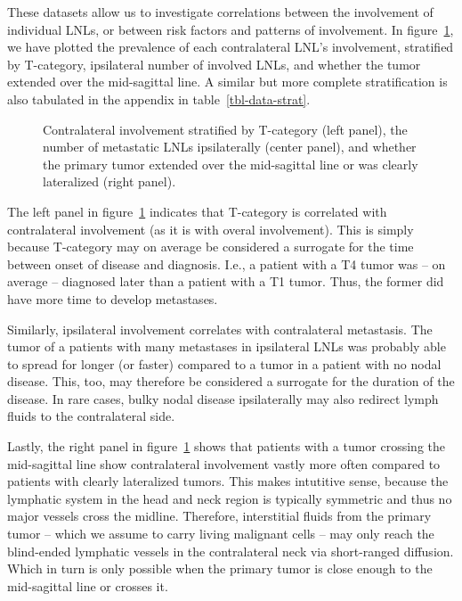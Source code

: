\documentclass[
  sn-mathphys-num,
]{sn-jnl}
\begin{document}
These datasets allow us to investigate correlations between the
involvement of individual LNLs, or between risk factors and patterns of
involvement. In figure~\ref{fig-data-strat}, we have plotted the
prevalence of each contralateral LNL's involvement, stratified by
T-category, ipsilateral number of involved LNLs, and whether the tumor
extended over the mid-sagittal line. A similar but more complete
stratification is also tabulated in the appendix in
table~\ref{tbl-data-strat}.

\begin{figure}


\caption{\label{fig-data-strat}Contralateral involvement stratified by
T-category (left panel), the number of metastatic LNLs ipsilaterally
(center panel), and whether the primary tumor extended over the
mid-sagittal line or was clearly lateralized (right panel).}

\end{figure}%

The left panel in figure~\ref{fig-data-strat} indicates that T-category
is correlated with contralateral involvement (as it is with overal
involvement). This is simply because T-category may on average be
considered a surrogate for the time between onset of disease and
diagnosis. I.e., a patient with a T4 tumor was -- on average --
diagnosed later than a patient with a T1 tumor. Thus, the former did
have more time to develop metastases.

Similarly, ipsilateral involvement correlates with contralateral
metastasis. The tumor of a patients with many metastases in ipsilateral
LNLs was probably able to spread for longer (or faster) compared to a
tumor in a patient with no nodal disease. This, too, may therefore be
considered a surrogate for the duration of the disease. In rare cases,
bulky nodal disease ipsilaterally may also redirect lymph fluids to the
contralateral side.

Lastly, the right panel in figure~\ref{fig-data-strat} shows that
patients with a tumor crossing the mid-sagittal line show contralateral
involvement vastly more often compared to patients with clearly
lateralized tumors. This makes intutitive sense, because the lymphatic
system in the head and neck region is typically symmetric and thus no
major vessels cross the midline. Therefore, interstitial fluids from the
primary tumor -- which we assume to carry living malignant cells -- may
only reach the blind-ended lymphatic vessels in the contralateral neck
via short-ranged diffusion. Which in turn is only possible when the
primary tumor is close enough to the mid-sagittal line or crosses it.
\end{document}
